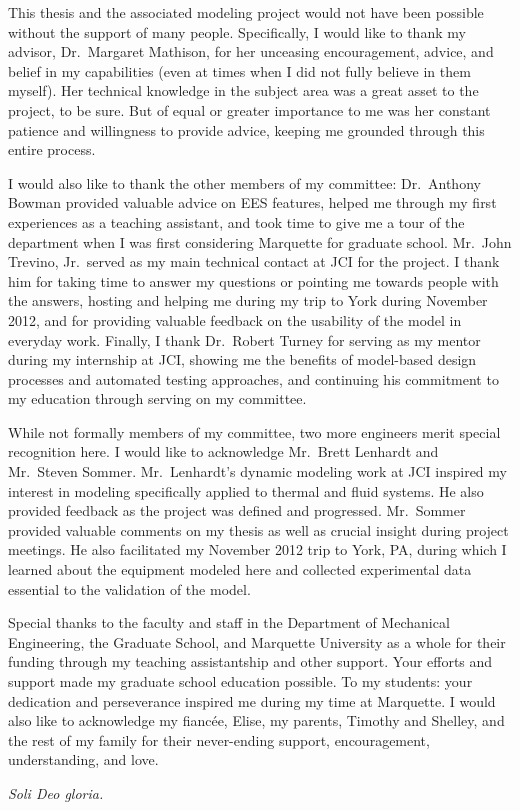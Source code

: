 \begin{acknowledgments}
  This thesis and the associated modeling project 
  would not have been possible without the support of many people. 
  Specifically, I would like to thank my advisor, Dr.~Margaret Mathison,
  for her unceasing encouragement, advice, and belief in my capabilities 
  (even at times when I did not fully believe in them myself). 
  Her technical knowledge in the subject area was a 
  great asset to the project, to be sure.
  But of equal or greater importance to me was 
  her constant patience and willingness to provide advice, 
  keeping me grounded through this entire process.
  
  I would also like to thank the other members of my committee:
  Dr.~Anthony Bowman provided valuable advice on EES features,
  helped me through my first experiences as a teaching assistant, 
  and took time to give me a tour of the department when I was 
  first considering Marquette for graduate school.
  Mr.~John Trevino, Jr.~served as my main technical contact at JCI
  for the project. I thank him for taking time to answer my questions
  or pointing me towards people with the answers, hosting and helping
  me during my trip to York during November 2012, and for providing
  valuable feedback on the usability of the model in everyday work.
  Finally, I thank Dr.~Robert Turney for serving as my mentor
  during my internship at JCI, showing me the benefits of model-based
  design processes and automated testing approaches, and continuing
  his commitment to my education through serving on my committee.
  
  While not formally members of my committee, two more 
  engineers merit special recognition here. 
  I would like to acknowledge Mr.~Brett Lenhardt and Mr.~Steven Sommer.
  Mr.~Lenhardt's dynamic modeling work at JCI inspired my interest
  in modeling specifically applied to thermal and fluid systems.
  He also provided feedback as the project was defined and progressed.
  Mr.~Sommer provided valuable comments on my thesis as well as crucial
  insight during project meetings. He also facilitated my November 2012 trip
  to York, PA, during which I learned about the equipment modeled here
  and collected experimental data essential to the validation of the model.

  Special thanks to the faculty and staff in the Department of 
  Mechanical Engineering, the Graduate School, and Marquette University 
  as a whole for their funding through my teaching assistantship and other support.
  Your efforts and support made my graduate school education possible.
  To my students: your dedication and perseverance 
  inspired me during my time at Marquette. 
  I would also like to acknowledge my fianc\'ee, Elise, 
  my parents, Timothy and Shelley, and the rest of my family for their 
  never-ending support, encouragement, understanding, and love.

  \vfill \centering
    \emph{Soli Deo gloria.}
  \vfill
\end{acknowledgments}
